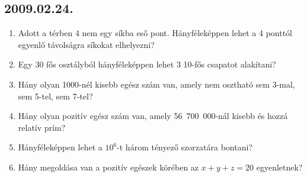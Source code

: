 \documentclass{article}
\begin{document}
\subsection*{2009.02.24.}
\begin{enumerate}
\item Adott a térben 4 nem egy síkba eső pont. Hányféleképpen lehet a 4 ponttól egyenlő távolságra síkokat elhelyezni?
\item Egy 30 fős osztályból hányféleképpen lehet 3 10-fős csapatot alakítani?
\item Hány olyan 1000-nél kisebb egész szám van, amely nem osztható sem 3-mal, sem 5-tel, sem 7-tel?
\item Hány olyan pozitív egész szám van, amely 56~700~000-nál kisebb és hozzá relatív prím?
\item Hányféleképpen lehet a $10^6$-t három tényező szorzatára bontani?
\item Hány megoldása van a pozitív egészek körében az $x+y+z=20$ egyenletnek?
\end{enumerate}
\end{document}
